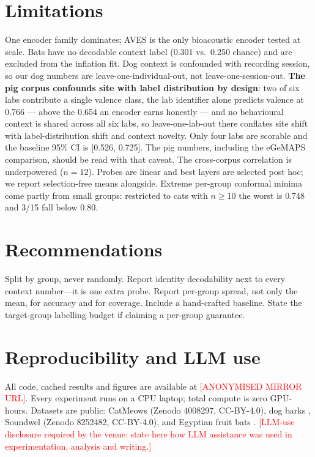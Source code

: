 \documentclass{article}
\begin{document}
\section{Limitations}

One encoder family dominates; AVES is the only bioacoustic encoder tested at scale. Bats have no
decodable context label (0.301 vs.\ 0.250 chance) and are excluded from the inflation fit. Dog context
is confounded with recording session, so our dog numbers are leave-one-individual-out, not
leave-one-session-out. \textbf{The pig corpus confounds site with label distribution by design}: two
of six labs contribute a single valence class, the lab identifier alone predicts valence at 0.766 ---
above the 0.654 an encoder earns honestly --- and no behavioural context is shared across all six
labs, so leave-one-lab-out there conflates site shift with label-distribution shift and context
novelty. Only four labs are scorable and the baseline 95\% CI is [0.526, 0.725]. The pig numbers,
including the eGeMAPS comparison, should be read with that caveat. The cross-corpus correlation is underpowered ($n{=}12$). Probes are linear and
best layers are selected post hoc; we report selection-free means alongside. Extreme per-group
conformal minima come partly from small groups: restricted to cats with $n\geq10$ the worst is 0.748
and 3/15 fall below 0.80.

\section{Recommendations}

Split by group, never randomly. Report identity decodability next to every context number---it is one
extra probe. Report per-group spread, not only the mean, for accuracy and for coverage. Include a
hand-crafted baseline. State the target-group labelling budget if claiming a per-group guarantee.

\section*{Reproducibility and LLM use}

All code, cached results and figures are available at \textcolor{red}{[ANONYMISED MIRROR URL]}. Every
experiment runs on a CPU laptop; total compute is zero GPU-hours. Datasets are public: CatMeows \citep{ludovico2021,ntalampiras2019} (Zenodo 4008297, CC-BY-4.0), dog
barks \citep{molnar2008}, Soundwel \citep{briefer2022} (Zenodo 8252482, CC-BY-4.0), and Egyptian
fruit bats \citep{prat2017}. \textcolor{red}{[LLM-use disclosure required by the venue: state
here how LLM assistance was used in experimentation, analysis and writing.]}



\end{document}
